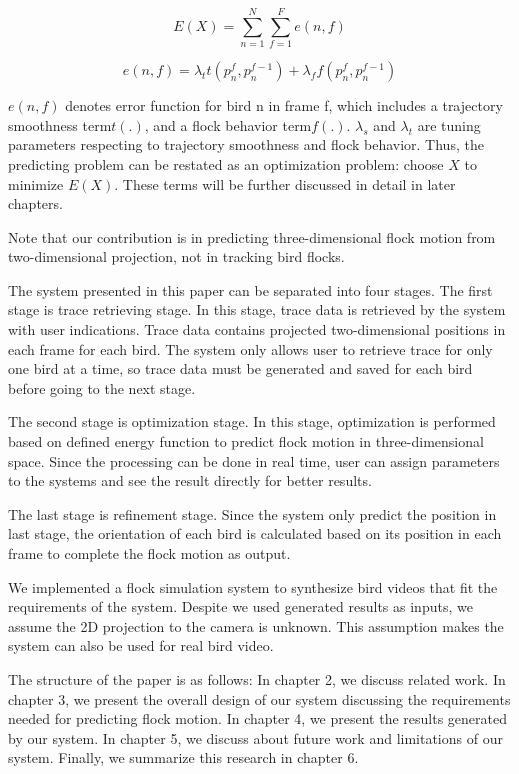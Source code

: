 \begin{equation}\label{eq:1}
 E(X) = \sum_{n = 1}^{N} \sum_{f = 1}^{F}e(n,f)
\end{equation}


\begin{equation}\label{eq:2}
 e(n,f) = \lambda_tt(p_n^f, p_n^{f-1}) + \lambda_ff(p_n^f, p_n^{f-1})
\end{equation}


$e(n,f)$ denotes error function for bird n in frame f, which includes a trajectory smoothness term$t(.)$, and a flock behavior term$f(.)$. $\lambda_s$ and $\lambda_t$ are tuning parameters respecting to trajectory smoothness and flock behavior. Thus, the predicting problem can be restated as an optimization problem: choose $X$ to minimize $E(X)$. These terms will be further discussed in detail in later chapters.


Note that our contribution is in predicting three-dimensional flock motion from two-dimensional projection, not in tracking bird flocks.


The system presented in this paper can be separated into four stages. The first stage is trace retrieving stage. In this stage, trace data is retrieved by the system with user indications. Trace data contains projected two-dimensional positions in each frame for each bird. The system only allows user to retrieve trace for only one bird at a time, so trace data must be generated and saved for each bird before going to the next stage.


The second stage is optimization stage. In this stage, optimization is performed based on defined energy function to predict flock motion in three-dimensional space. Since the processing can be done in real time, user can assign parameters to the systems and see the result directly for better results.


The last stage is refinement stage. Since the system only predict the position in last stage, the orientation of each bird is calculated based on its position in each frame to complete the flock motion as output.


We implemented a flock simulation system to synthesize bird videos that fit the requirements of the system. Despite we used generated results as inputs, we assume the 2D projection to the camera is unknown. This assumption makes the system can also be used for real bird video.


The structure of the paper is as follows: In chapter 2, we discuss related work. In chapter 3, we present the overall design of our system discussing the requirements needed for predicting flock motion. In chapter 4, we present the results generated by our system. In chapter 5, we discuss about future work and limitations of our system. Finally, we summarize this research in chapter 6.

